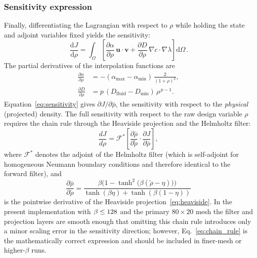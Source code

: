 \subsubsection{Sensitivity expression}
Finally, differentiating the Lagrangian with respect to \(\rho\) while holding the state and adjoint variables fixed yields the sensitivity:
\begin{equation}
    \boxed{\,
    \frac{\mathrm{d}J}{\mathrm{d}\rho} = \int_\Omega
        \left[ \frac{\partial\alpha}{\partial\rho}\,\mathbf{u}\cdot\mathbf{v}
             + \frac{\partial D}{\partial\rho}\,\nabla c\cdot\nabla\lambda \right] \mathrm{d}\Omega
    \,}.
    \label{eq:sensitivity}
\end{equation}
The partial derivatives of the interpolation functions are
\begin{align}
    \frac{\partial\alpha}{\partial\rho} &= -(\alpha_{\max} - \alpha_{\min})\,\frac{2}{(1+\rho)^2},
        \label{eq:dalpha} \\[4pt]
    \frac{\partial D}{\partial\rho} &= p\,(D_{\text{fluid}} - D_{\min})\,\rho^{\,p-1}.
        \label{eq:dD}
\end{align}
Equation~\eqref{eq:sensitivity} gives \(\partial J/\partial\bar{\rho}\), the sensitivity with respect to the \emph{physical} (projected) density.
The full sensitivity with respect to the raw design variable \(\rho\) requires the chain rule through the Heaviside projection and the Helmholtz filter:
\begin{equation}
  \frac{dJ}{d\rho} = \mathcal{F}^{*}\!\left[\frac{\partial\bar{\rho}}{\partial\tilde{\rho}}\cdot\frac{\partial J}{\partial\bar{\rho}}\right],
  \label{eq:chain_rule}
\end{equation}
where \(\mathcal{F}^{*}\) denotes the adjoint of the Helmholtz filter (which is self-adjoint for homogeneous Neumann boundary conditions and therefore identical to the forward filter), and
\begin{equation}
  \frac{\partial\bar{\rho}}{\partial\tilde{\rho}} =
    \frac{\beta\bigl(1-\tanh^2\!\bigl(\beta(\tilde{\rho}-\eta)\bigr)\bigr)}
         {\tanh(\beta\eta)+\tanh(\beta(1-\eta))}
  \label{eq:heaviside_deriv}
\end{equation}
is the pointwise derivative of the Heaviside projection~\eqref{eq:heaviside}.
In the present implementation with \(\beta\le128\) and the primary \(80\times20\) mesh the filter and projection layers are smooth enough that omitting this chain rule introduces only a minor scaling error in the sensitivity direction; however, Eq.~\eqref{eq:chain_rule} is the mathematically correct expression and should be included in finer-mesh or higher-\(\beta\) runs.

